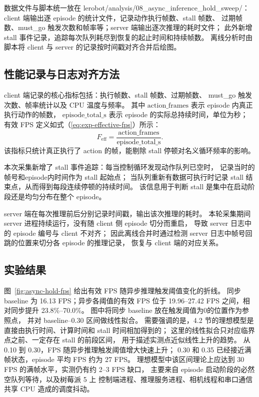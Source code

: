 数据文件与脚本统一放在
lerobot/analysis/08\_async\_inference\_hold\_sweep/：
client 端输出逐 episode 的统计文件，记录动作执行帧数、stall 帧数、
过期帧数、must\_go 触发次数和帧率等；server 端输出逐次推理的耗时文件；
此外新增 stall 事件记录，追踪每次队列耗尽到恢复的起止时间和持续帧数。
离线分析时由脚本将 client 与 server 的记录按时间戳对齐合并后绘图。

\subsection{性能记录与日志对齐方法}\label{sec:async-exp-metrics}

client 端记录的核心指标包括：执行帧数、stall 帧数、过期帧数、
must\_go 触发次数、帧率统计以及 CPU 温度与频率。
其中 $\mathrm{action\_frames}$ 表示 episode 内真正执行动作的帧数，
$\mathrm{episode\_total\_s}$ 表示 episode 的实际总持续时间，单位为秒；
有效 FPS 定义如式（\ref{eq:exp-effective-fps}）所示：
\begin{equation}
  F_{\text{eff}} = \frac{\mathrm{action\_frames}}{\mathrm{episode\_total\_s}}.
  \label{eq:exp-effective-fps}
\end{equation}
该指标只统计真正执行了 action 的帧，能剔除 stall 停顿对名义循环频率的影响。

本次采集新增了 stall 事件追踪：每当控制循环发现动作队列已空时，
记录当时的帧号和episode内时间作为 stall 起始点；
当队列重新有数据可执行时记录 stall 结束点，从而得到每段连续停顿的持续时间。
该信息用于判断 stall 是集中在启动阶段还是均匀分布在整个 episode。

server 端在每次推理前后分别记录时间戳，输出该次推理的耗时。
本轮采集期间 server 进程持续运行，没有随 client 侧 episode 切分而重启，
导致 server 日志中的 episode 编号与 client 不对齐；
因此离线合并时通过检测 server 日志中帧号回跳的位置来切分各 episode 的推理记录，
恢复与 client 端的对应关系。

\subsection{实验结果}\label{sec:async-exp-results}

图~\ref{fig:async-hold-fps} 给出有效 FPS 随异步推理触发阈值变化的折线。
同步 baseline 为 16.13 FPS；异步各阈值的有效 FPS 位于
19.96--27.42 FPS 之间，相对同步提升 23.8\%--70.0\%。
图中将同步 baseline 放在触发阈值为0的位置作为参照点，
并对 baseline--0.30 区间做线性拟合。
需要强调的是，4.2 节的理想模型是直接由执行时间、计算时间和 stall 时间相加得到的；
这里的线性拟合只对应临界点之前、一定存在 stall 的前段区间，
用于描述实测点近似线性上升的趋势。
从 0.10 到 0.30，FPS 随异步推理触发阈值增大快速上升；
0.30 和 0.35 已经接近满帧状态，episode 平均 FPS 约为 27 FPS。
理想模型中该区间理论上应达到 30 FPS 的满帧水平，实测仍有约 2--3 FPS 缺口，
主要来自 episode 启动阶段的必然空队列等待，以及树莓派 5 上
控制端进程、推理服务进程、相机线程和串口通信共享 CPU
造成的调度抖动。

